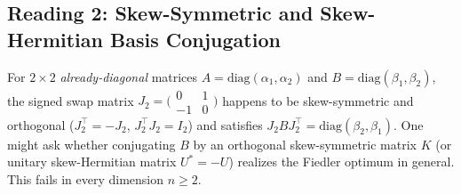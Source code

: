 \documentclass[11pt,a4paper]{article}
\theoremstyle{plain}
\theoremstyle{definition}
\newcommand{\diag}{\mathrm{diag}}
\begin{document}
\subsection{Reading 2: Skew-Symmetric and Skew-Hermitian Basis Conjugation}
For $2 \times 2$ \emph{already-diagonal} matrices $A = \diag(\alpha_1, \alpha_2)$ and $B = \diag(\beta_1, \beta_2)$, the signed swap matrix $J_2 = \bigl(\begin{smallmatrix}0 & 1 \\ -1 & 0\end{smallmatrix}\bigr)$ happens to be skew-symmetric and orthogonal ($J_2^\top = -J_2$, $J_2^\top J_2 = I_2$) and satisfies $J_2 B J_2^\top = \diag(\beta_2, \beta_1)$. One might ask whether conjugating $B$ by an orthogonal skew-symmetric matrix $K$ (or unitary skew-Hermitian matrix $U^* = -U$) realizes the Fiedler optimum in general. This fails in every dimension $n \ge 2$.
\end{document}
